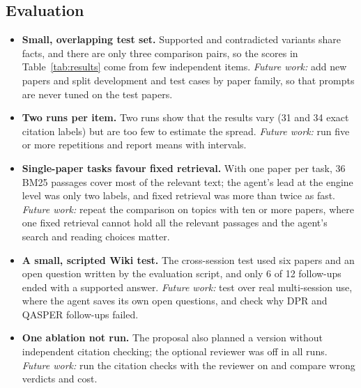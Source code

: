 \documentclass{article}
\begin{document}
\subsection{Evaluation}
\begin{itemize}
  \item \textbf{Small, overlapping test set.} Supported and contradicted variants share facts, and
  there are only three comparison pairs, so the scores in Table~\ref{tab:results} come from few
  independent items. \emph{Future work:} add new papers and split development and test cases by paper
  family, so that prompts are never tuned on the test papers.
  \item \textbf{Two runs per item.} Two runs show that the results vary (31 and 34 exact citation
  labels) but are too few to estimate the spread. \emph{Future work:} run five or more repetitions and
  report means with intervals.
  \item \textbf{Single-paper tasks favour fixed retrieval.} With one paper per task, 36 BM25 passages
  cover most of the relevant text; the agent's lead at the engine level was only two labels, and fixed
  retrieval was more than twice as fast.
  \emph{Future work:} repeat the comparison on topics with ten or more papers, where one fixed
  retrieval cannot hold all the relevant passages and the agent's search and reading choices matter.
  \item \textbf{A small, scripted Wiki test.} The cross-session test used six papers and an open
  question written by the evaluation script, and only 6 of 12 follow-ups ended with a supported
  answer. \emph{Future work:} test over real multi-session use, where the agent saves its own open
  questions, and check why DPR and QASPER follow-ups failed.
  \item \textbf{One ablation not run.} The proposal also planned a version without independent
  citation checking; the optional reviewer was off in all runs. \emph{Future work:} run the citation
  checks with the reviewer on and compare wrong verdicts and cost.
\end{itemize}
\end{document}
